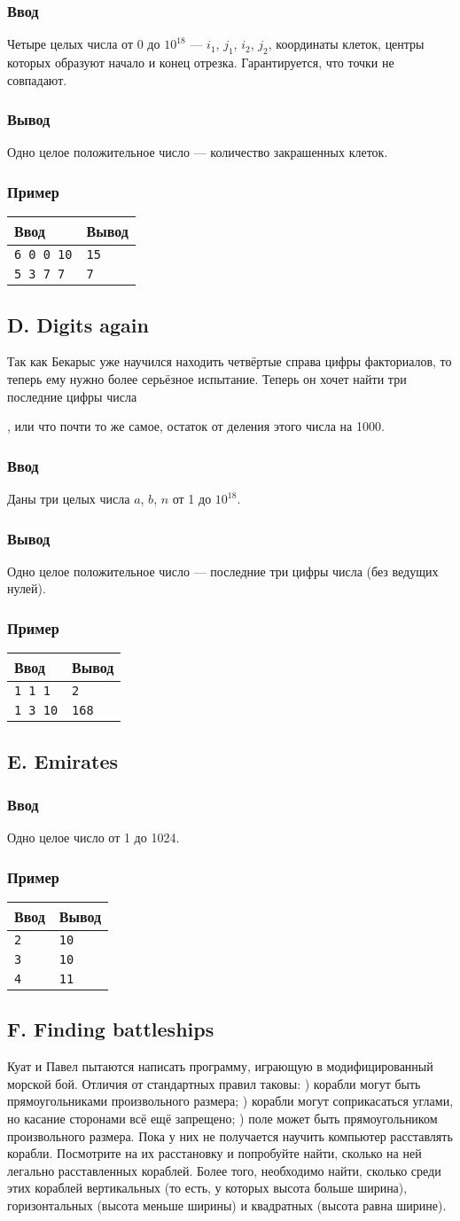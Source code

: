 \documentclass[10pt, a4paper]{article}
\newcommand{\informat}[1]
{
	\subsubsection*{Ввод} #1
}
\newcommand{\outformat}[1]
{
	\subsubsection*{Вывод} #1
}
\newcommand{\examplee}[4]
{
	\subsubsection*{Пример}
	\noindent
	\begin{center}
	\begin{tabularx}{\linewidth}{|X|X|}
	\hline
	Ввод 	& Вывод  	\\
	\hline
	{\tt #1} & {\tt #2}	\\
	\hline
	{\tt #3} & {\tt #4}	\\
	\hline
	\end{tabularx}
	\end{center}
}
\newcommand{\exampleee}[6]
{
	\subsubsection*{Пример}
	\noindent
	\begin{center}
	\begin{tabularx}{\linewidth}{|X|X|}
	\hline
	Ввод 	& Вывод  	\\
	\hline
	{\tt #1} & {\tt #2}	\\
	\hline
	{\tt #3} & {\tt #4}	\\
	\hline
	{\tt #5} & {\tt #6}	\\
	\hline
	\end{tabularx}
	\end{center}
}
\begin{document}


\informat{Четыре целых числа от 0 до $10^{18}$ --- $i_1$, $j_1$, $i_2$, $j_2$, координаты клеток, центры которых образуют начало и конец отрезка. Гарантируется, что точки не совпадают.}

\outformat{Одно целое положительное число --- количество закрашенных клеток.}

\examplee{6 0 0 10}{15}{5 3 7 7}{7}

\newpage

\subsection*{D. Digits again}

Так как Бекарыс уже научился находить четвёртые справа цифры факториалов, то теперь ему нужно более серьёзное испытание. Теперь он хочет найти три последние цифры числа 

, или что почти то же самое, остаток от деления этого числа на 1000.

\informat{Даны три целых числа $a$, $b$, $n$ от 1 до $10^{18}$.}

\outformat{Одно целое положительное число --- последние три цифры числа (без ведущих нулей).}

\examplee{1 1 1}{2}{1 3 10}{168}

\newpage

\subsection*{E. Emirates}



\informat{Одно целое число от 1 до 1024.}

\exampleee{2}{10}{3}{10}{4}{11}

\newpage

\subsection*{F. Finding battleships}

Куат и Павел пытаются написать программу, играющую в модифицированный морской бой. Отличия от стандартных правил таковы: ) корабли могут быть прямоугольниками произвольного размера; ) корабли могут соприкасаться углами, но касание сторонами всё ещё запрещено; ) поле может быть прямоугольником произвольного размера. \newline
Пока у них не получается научить компьютер расставлять корабли. Посмотрите на их расстановку и попробуйте найти, сколько на ней легально расставленных кораблей. Более того, необходимо найти, сколько среди этих кораблей вертикальных (то есть, у которых высота больше ширина), горизонтальных (высота меньше ширины) и квадратных (высота равна ширине).
\end{document}
